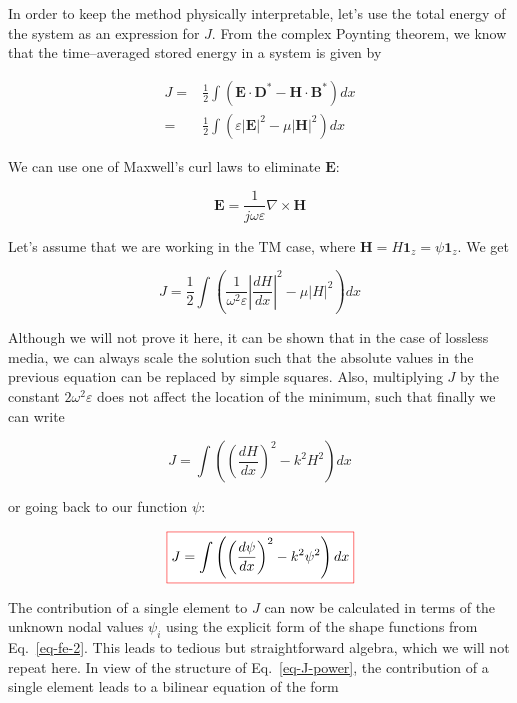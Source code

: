 In order to keep the method physically interpretable, let's use the total energy of the system as an expression for $J$. From the complex Poynting theorem, we know that the time--averaged stored energy in a system is given by

\begin{align}
J =& \frac{1}{2} \int ( {\mathbf E} \cdot {\mathbf D}^* - {\mathbf H} \cdot {\mathbf B}^* ) dx \\
  =& \frac{1}{2} \int ( \varepsilon |{\mathbf E}|^2 - \mu |{\mathbf H}|^2 ) dx
\end{align} 

We can use one of Maxwell's curl laws to eliminate ${\mathbf E}$:

\begin{equation}
{\mathbf E} = \frac{1}{j \omega \varepsilon} \nabla \times {\mathbf H}
\end{equation}  

Let's assume that we are working in the TM case, where ${\mathbf H} = H {\mathbf 1}_z = \psi {\mathbf 1}_z $. We get

\begin{equation}
J = \frac{1}{2} \int \left( \frac{1}{\omega ^2 \varepsilon}\left|{\frac{d H}{d x}}\right|^2 - \mu |H|^2 \right) dx
\end{equation}

Although we will not prove it here, it can be shown that in the case of lossless media, we can always scale the solution such that the absolute values in the previous equation can be replaced by simple squares. Also, multiplying $J$ by the constant $2 \omega ^2 \varepsilon$ does not affect the location of the minimum, such that finally we can write

\begin{equation}
J = \int \left( \left(\frac{d H}{d x}\right)^2 - k^2 H^2 \right) dx
\end{equation}

or going back to our function $\psi$:

\begin{equation}
\fbox{$\displaystyle
J = \int \left( \left(\frac{d \psi}{d x}\right)^2 - k^2 \psi^2 \right) dx \label{eq-J-power}
$}
\end{equation} 

The contribution of a single element to $J$ can now be calculated in terms of the unknown nodal values $\psi_i$ using the explicit form of the shape functions from Eq.~\ref{eq-fe-2}. This leads to tedious but straightforward algebra, which we will not repeat here. In view of the structure of Eq.~\ref{eq-J-power}, the contribution of a single element leads to a bilinear equation of the form

